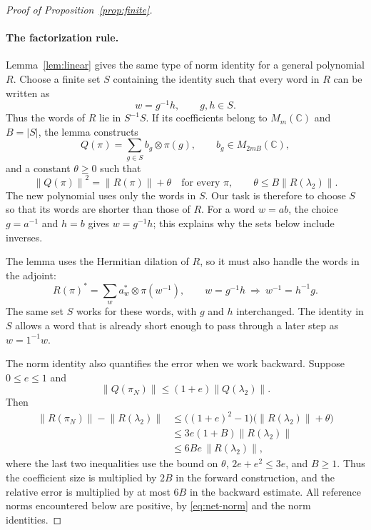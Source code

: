\documentclass[11pt]{article}
\numberwithin{equation}{section}
\theoremstyle{boldremark}\newtheorem{remark}[theorem]{Remark}
\newcommand{\C}{\mathbb C}
\newcommand{\M}{M}
\newcommand{\norm}[1]{\left\lVert #1\right\rVert}
\begin{document}
\begin{proof}[Proof of Proposition~\ref{prop:finite}]
\paragraph{The factorization rule.}
Lemma~\ref{lem:linear} gives the same type of norm identity for a general
polynomial $R$. Choose a finite set $S$ containing the identity such
that every word in $R$ can be written as
\[
 w=g^{-1}h,\qquad g,h\in S.
\]
Thus the words of $R$ lie in $S^{-1}S$. If its coefficients belong to
$\M_m(\C)$ and $B=|S|$, the lemma constructs
\[
 Q(\pi)=\sum_{g\in S}b_g\otimes\pi(g),\qquad
 b_g\in\M_{2mB}(\C),
\]
and a constant $\theta\ge0$ such that
\[
 \norm{Q(\pi)}^2=\norm{R(\pi)}+\theta
 \quad\text{for every }\pi,\qquad
 \theta\le B\norm{R(\lambda_2)}.
\]
The new polynomial uses only the words in $S$. Our task is therefore
to choose $S$ so that its words are shorter than those of $R$.
For a word $w=ab$, the choice $g=a^{-1}$ and $h=b$ gives
$w=g^{-1}h$; this explains why the sets below include inverses.

The lemma uses the Hermitian dilation of $R$, so it must also handle
the words in the adjoint:
\[
 R(\pi)^*=\sum_w a_w^*\otimes\pi(w^{-1}),\qquad
 w=g^{-1}h\ \Longrightarrow\ w^{-1}=h^{-1}g.
\]
The same set $S$ works for these words, with $g$ and $h$ interchanged.
The identity in $S$ allows a word that is already short enough to
pass through a later step as $w=1^{-1}w$.

The norm identity also quantifies the error when we work backward.
Suppose $0\le e\le1$ and
\[
 \norm{Q(\pi_N)}\le(1+e)\norm{Q(\lambda_2)}.
\]
Then
\[
 \begin{aligned}
 \norm{R(\pi_N)}-\norm{R(\lambda_2)}
 &\le\bigl((1+e)^2-1\bigr)
          \bigl(\norm{R(\lambda_2)}+\theta\bigr)\\
 &\le3e(1+B)\norm{R(\lambda_2)}\\
 &\le6Be\,\norm{R(\lambda_2)},
 \end{aligned}
\]
where the last two inequalities use the bound on $\theta$,
$2e+e^2\le3e$, and $B\ge1$.
Thus the coefficient size is multiplied by $2B$ in the forward
construction, and the relative error is multiplied by at most
$6B$ in the backward estimate.
All reference norms encountered below are positive, by
\eqref{eq:net-norm} and the norm identities.


\end{proof}
\end{document}
